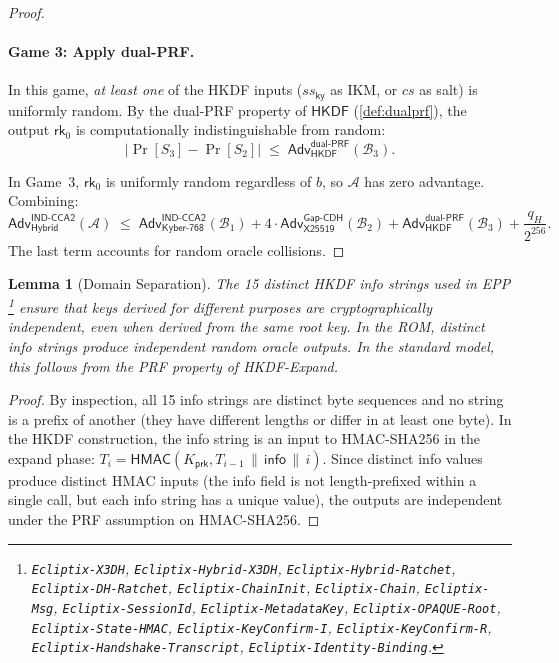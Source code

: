 \documentclass[11pt,a4paper]{article}
\newtheorem{lemma}[theorem]{Lemma}
\theoremstyle{definition}
\theoremstyle{remark}
\newcommand{\adv}{\mathsf{Adv}}
\newcommand{\advA}{\mathcal{A}}
\newcommand{\advB}{\mathcal{B}}
\newcommand{\HKDF}{\mathsf{HKDF}}
\newcommand{\HMAC}{\mathsf{HMAC}}
\renewcommand{\DH}{\mathsf{X25519}}
\newcommand{\KEM}{\mathsf{Kyber\text{-}768}}
\newcommand{\GapCDH}{\mathsf{Gap\text{-}CDH}}
\newcommand{\INDCCA}{\mathsf{IND\text{-}CCA2}}
\newcommand{\dualPRF}{\mathsf{dual\text{-}PRF}}
\newcommand{\rk}{\mathsf{rk}}
\newcommand{\concat}{\,\|\,}
\begin{document}
\begin{proof}
\paragraph{Game 3: Apply dual-PRF.}
In this game, \emph{at least one} of the HKDF inputs ($\mathit{ss}_{\mathsf{ky}}$
as IKM, or $\mathit{cs}$ as salt) is uniformly random.  By the dual-PRF
property of $\HKDF$ (\cref{def:dualprf}), the output $\rk_0$ is
computationally indistinguishable from random:
\[
  |\Pr[S_3] - \Pr[S_2]| \;\leq\; \adv^{\dualPRF}_{\HKDF}(\advB_3).
\]

In Game~3, $\rk_0$ is uniformly random regardless of $b$, so
$\advA$ has zero advantage.  Combining:
\[
  \adv^{\INDCCA}_{\mathsf{Hybrid}}(\advA)
  \;\leq\; \adv^{\INDCCA}_{\KEM}(\advB_1) + 4 \cdot \adv^{\GapCDH}_{\DH}(\advB_2) + \adv^{\dualPRF}_{\HKDF}(\advB_3) + \frac{q_H}{2^{256}}.
\]
The last term accounts for random oracle collisions. \qedhere
\end{proof}

\begin{lemma}[Domain Separation]
\label{lem:domain-sep}
The 15 distinct HKDF info strings used in EPP%
\footnote{%
\texttt{Ecliptix-X3DH}, \texttt{Ecliptix-Hybrid-X3DH},
\texttt{Ecliptix-Hybrid-Ratchet}, \texttt{Ecliptix-DH-Ratchet},
\texttt{Ecliptix-ChainInit}, \texttt{Ecliptix-Chain},
\texttt{Ecliptix-Msg}, \texttt{Ecliptix-SessionId},
\texttt{Ecliptix-MetadataKey}, \texttt{Ecliptix-OPAQUE-Root},
\texttt{Ecliptix-State-HMAC}, \texttt{Ecliptix-KeyConfirm-I},
\texttt{Ecliptix-KeyConfirm-R}, \texttt{Ecliptix-Handshake-Transcript},
\texttt{Ecliptix-Identity-Binding}.%
}
ensure that keys derived for different purposes are cryptographically
independent, even when derived from the same root key.  In the ROM,
distinct info strings produce independent random oracle outputs.
In the standard model, this follows from the PRF property of HKDF-Expand.
\end{lemma}

\begin{proof}
By inspection, all 15 info strings are distinct byte sequences and no
string is a prefix of another (they have different lengths or differ in at
least one byte).  In the HKDF construction, the info string is an input to
HMAC-SHA256 in the expand phase: $T_i = \HMAC(K_{\mathsf{prk}}, T_{i-1}
\concat \mathsf{info} \concat i)$.  Since distinct info values produce
distinct HMAC inputs (the info field is not length-prefixed within a single
call, but each info string has a unique value), the outputs are independent
under the PRF assumption on HMAC-SHA256. \qedhere
\end{proof}
\end{document}
